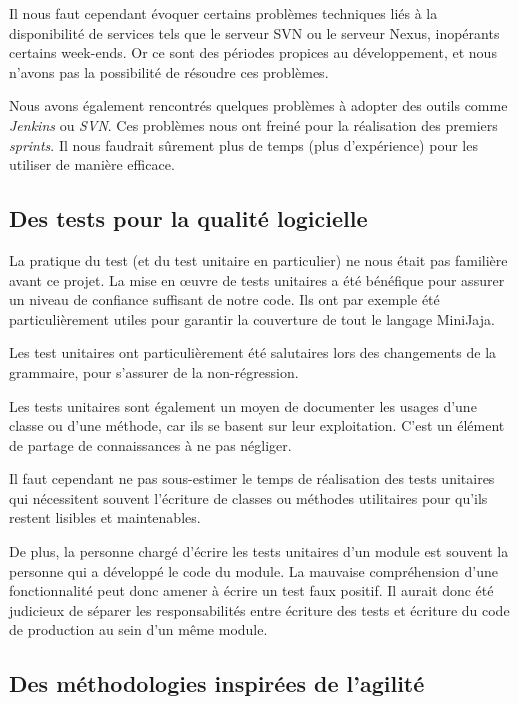 \documentclass[a4paper,12pt]{article}
\begin{document}
Il nous faut cependant évoquer certains problèmes techniques liés à la disponibilité de services tels que le serveur SVN ou le serveur Nexus, inopérants certains week-ends. Or ce sont des périodes propices au développement, et nous n'avons pas la possibilité de résoudre ces problèmes.

Nous avons également rencontrés quelques problèmes à adopter des outils comme \emph{Jenkins} ou \emph{SVN}. Ces problèmes nous ont freiné pour la réalisation des premiers \emph{sprints}.
Il nous faudrait sûrement plus de temps (plus d'expérience) pour les utiliser de manière efficace.


\subsection{Des tests pour la qualité logicielle}

La pratique du test (et du test unitaire en particulier) ne nous était pas familière avant ce projet.
La mise en œuvre de tests unitaires a été bénéfique pour assurer un niveau de confiance suffisant de notre code. Ils ont par exemple été particulièrement utiles pour garantir la couverture de tout le langage MiniJaja.

Les test unitaires ont particulièrement été salutaires lors des changements de la grammaire, pour s'assurer de la non-régression.

Les tests unitaires sont également un moyen de documenter les usages d'une classe ou d'une méthode, car ils se basent sur leur exploitation. C'est un élément de partage de connaissances à ne pas négliger.

Il faut cependant ne pas sous-estimer le temps de réalisation des tests unitaires qui nécessitent souvent l'écriture de classes ou méthodes utilitaires pour qu'ils restent lisibles et maintenables.

De plus, la personne chargé d'écrire les tests unitaires d'un module est souvent la personne qui a développé le code du module. La mauvaise compréhension d'une fonctionnalité peut donc amener à écrire un test faux positif.
Il aurait donc été judicieux de séparer les responsabilités entre écriture des tests et écriture du code de production au sein d'un même module.


\subsection{Des méthodologies inspirées de l'agilité}
\end{document}
